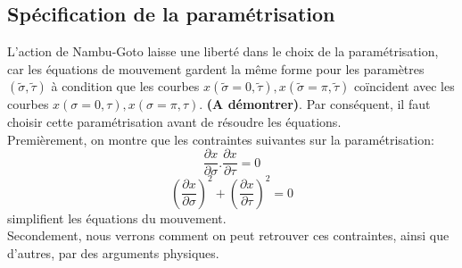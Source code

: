 \documentclass[a4paper,12pt]{article}
\begin{document}
\subsection{Spécification de la paramétrisation}
L'action de Nambu-Goto laisse une liberté dans le choix de la paramétrisation, car les équations de mouvement gardent la même forme pour les paramètres $(\tilde{\sigma},\tilde{\tau})$ à condition que les courbes $x(\tilde{\sigma}=0,\tilde{\tau}), x(\tilde{\sigma}=\pi,\tilde{\tau})$ coïncident avec les courbes $x(\sigma=0,\tau), x(\sigma=\pi,\tau)$. \textbf{(A démontrer)}.
Par conséquent, il faut choisir cette paramétrisation avant de résoudre les équations.\\
Premièrement, on montre que les contraintes suivantes sur la paramétrisation:
\begin{equation}
\frac{\partial x}{\partial \sigma}.\frac{\partial x}{\partial \tau}=0
\end{equation}
\begin{equation}
\left( \frac{\partial x}{\partial \sigma}\right) ^{2}+\left(\frac{\partial x}{\partial \tau}\right) ^{2}=0 
\end{equation}
simplifient les équations du mouvement.\\ Secondement, nous verrons comment on peut retrouver ces contraintes, ainsi que d'autres, par des arguments physiques. 
\end{document}

